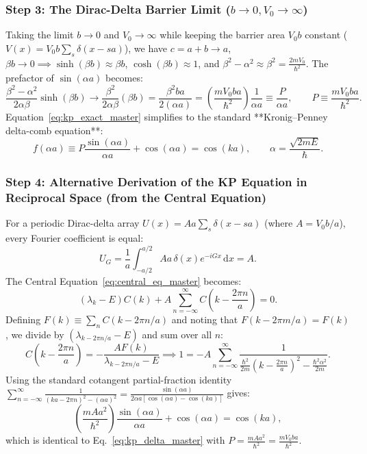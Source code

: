 \documentclass[11pt,a4paper]{article}
\newcommand{\hb}{\hbar}
\newcommand{\hbarsq}{\hb^2}
\newcommand{\dd}{\mathrm{d}}
\begin{document}
\subsubsection{Step 3: The Dirac-Delta Barrier Limit (\texorpdfstring{$b \to 0, V_0 \to \infty$}{b -> 0, V_0 -> infinity})}
Taking the limit $b \to 0$ and $V_0 \to \infty$ while keeping the barrier area $V_0 b$ constant ($V(x) = V_0 b \sum_s \delta(x - sa)$), we have $c = a+b \to a$, $\beta b \to 0 \implies \sinh(\beta b) \approx \beta b$, $\cosh(\beta b) \approx 1$, and $\beta^2 - \alpha^2 \approx \beta^2 = \frac{2mV_0}{\hbarsq}$. The prefactor of $\sin(\alpha a)$ becomes:
\begin{equation}
    \frac{\beta^2 - \alpha^2}{2\alpha\beta}\sinh(\beta b) \longrightarrow \frac{\beta^2}{2\alpha\beta}(\beta b) = \frac{\beta^2 b a}{2(\alpha a)} = \left(\frac{m V_0 b a}{\hbarsq}\right)\frac{1}{\alpha a} \equiv \frac{P}{\alpha a}, \qquad \boxed{P \equiv \frac{m V_0 b a}{\hbarsq}.}
\end{equation}
Equation~\eqref{eq:kp_exact_master} simplifies to the standard **Kronig--Penney delta-comb equation**:
\begin{equation}
    \boxed{f(\alpha a) \equiv P\frac{\sin(\alpha a)}{\alpha a} + \cos(\alpha a) = \cos(ka), \qquad \alpha = \frac{\sqrt{2mE}}{\hb}.}
    \label{eq:kp_delta_master}
\end{equation}

\subsubsection{Step 4: Alternative Derivation of the KP Equation in Reciprocal Space (from the Central Equation)}
For a periodic Dirac-delta array $U(x) = A a \sum_s \delta(x - sa)$ (where $A = V_0 b / a$), every Fourier coefficient is equal:
\begin{equation}
    U_G = \frac{1}{a}\int_{-a/2}^{a/2} A a\,\delta(x) e^{-iGx}\,\dd x = A.
\end{equation}
The Central Equation~\eqref{eq:central_eq_master} becomes:
\begin{equation}
    (\lambda_k - E)C(k) + A\sum_{n=-\infty}^\infty C\left(k - \frac{2\pi n}{a}\right) = 0.
\end{equation}
Defining $F(k) \equiv \sum_n C(k - 2\pi n/a)$ and noting that $F(k - 2\pi m/a) = F(k)$, we divide by $(\lambda_{k-2\pi n/a} - E)$ and sum over all $n$:
\begin{equation}
    C\left(k - \frac{2\pi n}{a}\right) = -\frac{A F(k)}{\lambda_{k-2\pi n/a} - E} \implies 1 = -A\sum_{n=-\infty}^\infty \frac{1}{\frac{\hbarsq}{2m}\left(k - \frac{2\pi n}{a}\right)^2 - \frac{\hbarsq\alpha^2}{2m}}.
\end{equation}
Using the standard cotangent partial-fraction identity $\sum_{n=-\infty}^\infty \frac{1}{(k a - 2\pi n)^2 - (\alpha a)^2} = \frac{\sin(\alpha a)}{2\alpha a[\cos(\alpha a) - \cos(ka)]}$ gives:
\begin{equation}
    \left(\frac{m A a^2}{\hbarsq}\right)\frac{\sin(\alpha a)}{\alpha a} + \cos(\alpha a) = \cos(ka),
\end{equation}
which is identical to Eq.~\eqref{eq:kp_delta_master} with $P = \frac{m A a^2}{\hbarsq} = \frac{m V_0 b a}{\hbarsq}$.
\end{document}
